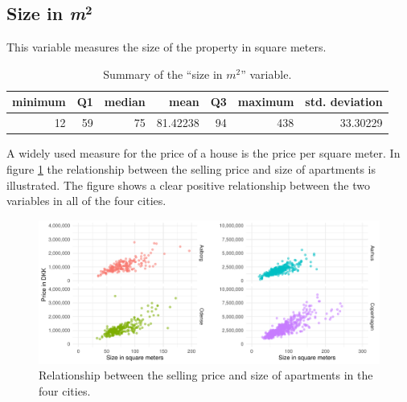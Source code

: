 \subsection*{Size in \textit{m}$\mathbf{^2}$}
This variable measures the size of the property in square meters.
\begin{table}[H]
    \centering
    \begin{tabular}{rrrrrrr}
        \toprule
        \textbf{minimum} & \textbf{Q1} & \textbf{median} & \textbf{mean} & \textbf{Q3} & \textbf{maximum} & \textbf{std. deviation}\\
        \midrule
        12 & 59 & 75 & 81.42238 & 94 & 438 & 33.30229\\
        \bottomrule
    \end{tabular}
    \caption{Summary of the ``size in $m^2$'' variable.}
    \label{tbl:size_in_m2}
\end{table}
A widely used measure for the price of a house is the price per square meter.
In figure \ref{fig:price_per_square_meter} the relationship between the selling price and size of apartments is illustrated.
The figure shows a clear positive relationship between the two variables in all of the four cities.
\begin{figure}[H]
    \centering
    \includegraphics[width=\textwidth]{figures/Data_introduction/price_per_square_meter.pdf}
    \caption{Relationship between the selling price and size of apartments in the four cities.}
    \label{fig:price_per_square_meter}
\end{figure}

